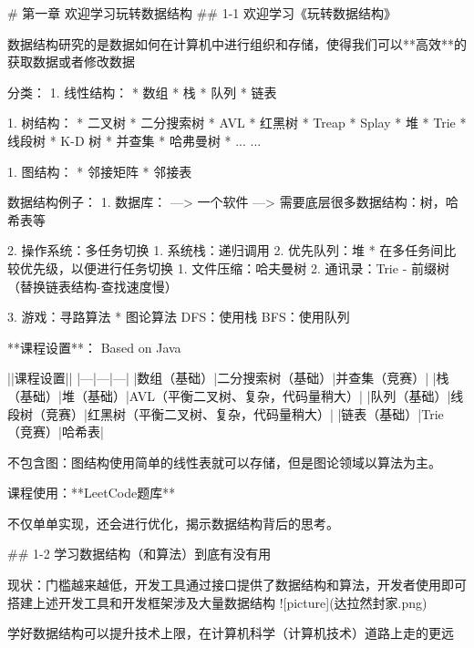\documentclass{ctexart}
\begin{document}
\begin{markdown}

# 第一章 欢迎学习玩转数据结构 
## 1-1 欢迎学习《玩转数据结构》

数据结构研究的是数据如何在计算机中进行组织和存储，使得我们可以**高效**的获取数据或者修改数据

分类：
1. 线性结构：
    * 数组
    * 栈
    * 队列
    * 链表
    
1. 树结构：
    * 二叉树
    * 二分搜索树
    * AVL
    * 红黑树
    * Treap
    * Splay
    * 堆
    * Trie
    * 线段树
    * K-D 树
    * 并查集
    * 哈弗曼树
    * ... ...
    
1. 图结构：
    * 邻接矩阵
    * 邻接表

数据结构例子：
1. 数据库：  ---> 一个软件 ---> 需要底层很多数据结构：树，哈希表等

2. 操作系统：多任务切换
    1. 系统栈：递归调用
    2. 优先队列：堆
        * 在多任务间比较优先级，以便进行任务切换
1. 文件压缩：哈夫曼树
2. 通讯录：Trie - 前缀树（替换链表结构-查找速度慢）

3. 游戏：寻路算法
    * 图论算法
        DFS：使用栈
        BFS：使用队列
        
**课程设置**：
Based on Java

||课程设置||
|---|---|---|
|数组（基础）|二分搜索树（基础）|并查集（竞赛）|
|栈（基础）|堆（基础）|AVL（平衡二叉树、复杂，代码量稍大）|
|队列（基础）|线段树（竞赛）|红黑树（平衡二叉树、复杂，代码量稍大）|
|链表（基础）|Trie（竞赛）|哈希表|

不包含图：图结构使用简单的线性表就可以存储，但是图论领域以算法为主。

课程使用：**LeetCode题库**

不仅单单实现，还会进行优化，揭示数据结构背后的思考。

## 1-2 学习数据结构（和算法）到底有没有用

现状：门槛越来越低，开发工具通过接口提供了数据结构和算法，开发者使用即可
搭建上述开发工具和开发框架涉及大量数据结构
![picture](达拉然封家.png)

学好数据结构可以提升技术上限，在计算机科学（计算机技术）道路上走的更远


\end{markdown}

\end{document}
